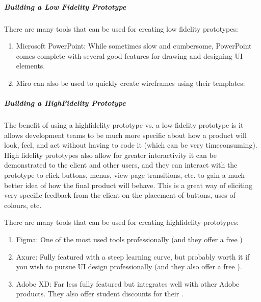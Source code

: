 \documentclass[letterpaper,10pt,english]{jupyterBook}
\begin{document}
\subparagraph{Building a Low Fidelity Prototype}
\label{\detokenize{chapter_8/requirements_elicitation:building-a-low-fidelity-prototype}}
\sphinxAtStartPar
There are many tools that can be used for creating low fidelity
prototypes:
\begin{enumerate}
%
\item {} 
\sphinxAtStartPar
Microsoft PowerPoint: While sometimes slow and cumbersome,
PowerPoint comes complete with several good features for drawing and
designing UI elements.  

\item {} 
\sphinxAtStartPar
Miro can also be used to quickly create wireframes using their
templates: 

\end{enumerate}


\subparagraph{Building a High\sphinxhyphen{}Fidelity Prototype}
\label{\detokenize{chapter_8/requirements_elicitation:building-a-high-fidelity-prototype}}
\sphinxAtStartPar
The benefit of using a high\sphinxhyphen{}fidelity prototype vs. a low fidelity
prototype is it allows development teams to be much more specific about
how a product will look, feel, and act without having to code it (which
can be very time\sphinxhyphen{}consuming). High fidelity prototypes also allow for
greater interactivity \sphinxhyphen{} it can be demonstrated to the client and other
users, and they can interact with the prototype to click buttons, menus,
view page transitions, etc. to gain a much better idea of how the final
product will behave. This is a great way of eliciting very specific
feedback from the client on the placement of buttons, uses of colours,
etc.

\sphinxAtStartPar
There are many tools that can be used for creating high\sphinxhyphen{}fidelity
prototypes:
\begin{enumerate}
%
\item {} 
\sphinxAtStartPar
Figma: One of the most used tools professionally (and they offer a
free )

\item {} 
\sphinxAtStartPar
Axure: Fully featured with a steep learning curve, but probably
worth it if you wish to pursue UI design professionally (and they
also offer a free ).

\item {} 
\sphinxAtStartPar
Adobe XD: Far less fully featured but integrates well with other
Adobe products. They also offer student discounts for their .

\end{enumerate}
\end{document}

